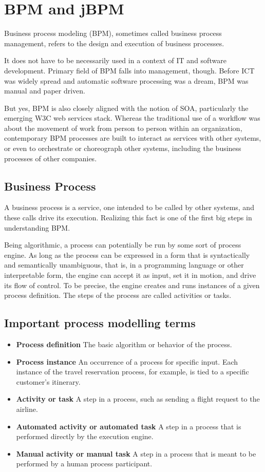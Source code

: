 \chapter{BPM and jBPM}\label{cha:bpm}

	\cite{bpm}
	Business process modeling (BPM), sometimes called business process management, refers to the design and execution of
	business processes.
	
	It does not have to be necessarily used in a context of \gls{IT} and software development. Primary field of BPM falls
	into management, though. Before \gls{ICT} was widely spread and automatic software processing was a dream, BPM was
	manual and paper driven.

	But yes, BPM is also closely aligned with the notion of \gls{SOA}, particularly the emerging W3C web services
	stack. Whereas the traditional use of a workflow was about the movement of work from person to person within an
	organization, contemporary BPM processes are built to interact as services with other systems, or even to orchestrate
	or choreograph other systems, including the business processes of other companies.

	\section{Business Process}

	A business process is a service, one intended to be called by other systems, and these calls drive its execution.
	Realizing this fact is one of the first big steps in understanding BPM.
	
	Being algorithmic, a process can potentially be run by some sort of process engine. As long as the process can be
	expressed in a form that is syntactically and semantically unambiguous, that is, in a programming language or other
	interpretable form, the engine can accept it as input, set it in motion, and drive its flow of control. To be precise,
	the engine creates and runs instances of a given process definition. The steps of the process are called activities or
	tasks.
	
	\section{Important process modelling terms}
	\begin{itemize}
		\item \textbf{Process definition}
		The basic algorithm or behavior of the process.
		\item \textbf{Process instance}
		An occurrence of a process for specific input. Each instance of the travel reservation process, for example, is tied
		to a specific customer's itinerary.
		\item \textbf{Activity or task}
		A step in a process, such as sending a flight request to the airline.
		\item \textbf{Automated activity or automated task}
		A step in a process that is performed directly by the execution engine.
		\item \textbf{Manual activity or manual task}
		A step in a process that is meant to be performed by a human process participant. 
	\end{itemize}
	
